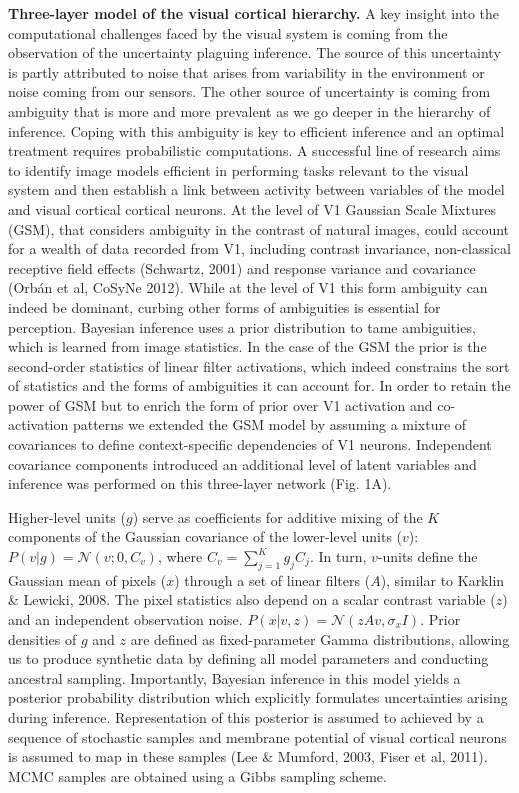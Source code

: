 \documentclass[12pt,a4paper]{article}
\begin{document}
\vspace{5mm}

{\bf Three-layer model of the visual cortical hierarchy.} A key insight into the computational challenges faced by the visual system is coming from the observation of the uncertainty plaguing inference. The source of this uncertainty is partly attributed to noise that arises from variability in the environment or noise coming from our sensors. The other source of uncertainty is coming from ambiguity that is more and more prevalent as we go deeper in the hierarchy of inference. Coping with this ambiguity is key to efficient inference and an optimal treatment requires probabilistic computations. 
A successful line of research aims to identify image models efficient in performing tasks relevant to the visual system and then establish a link between activity between variables of the model and visual cortical cortical neurons. 
At the level of V1 Gaussian Scale Mixtures (GSM), that considers ambiguity in the contrast of natural images, could account for a wealth of data recorded from V1, including contrast invariance, non-classical receptive field effects (Schwartz, 2001) and response variance and covariance (Orb\'an et al, CoSyNe 2012). While at the level of V1 this form ambiguity can indeed be dominant, curbing other forms of ambiguities is essential for perception. Bayesian inference uses a prior distribution to tame ambiguities, which is learned from image statistics. In the case of the GSM the prior is the second-order statistics of linear filter activations, which indeed constrains  the sort of statistics and the forms of ambiguities it can account for. In order to retain the power of GSM but to enrich the form of prior over V1 activation and co-activation patterns we extended the GSM model by assuming a mixture of covariances to define context-specific dependencies of V1 neurons. Independent covariance components introduced an additional level of latent variables and inference was performed on this three-layer network (Fig. 1A).

Higher-level units ($g$) serve as coefficients for additive mixing of the $K$ components of the Gaussian covariance of the lower-level units ($v$): $P(v | g) = \mathcal{N}(v;0,C_v)$, where $C_v = \sum_{j=1}^K g_jC_j$. In turn, $v$-units define the Gaussian mean of pixels ($x$) through a set of linear filters ($A$), similar to Karklin \& Lewicki, 2008. The pixel statistics also depend on a scalar contrast variable ($z$) and an independent observation noise. $P(x|v,z) = \mathcal{N}(zAv,\sigma_x I)$. Prior densities of $g$ and $z$ are defined as fixed-parameter Gamma distributions, allowing us to produce synthetic data by defining all model parameters and conducting ancestral sampling. Importantly, Bayesian inference in this model yields a posterior probability distribution which explicitly formulates  uncertainties arising during inference. Representation of this posterior is assumed to achieved by a sequence of stochastic samples and  membrane potential of visual cortical neurons is assumed to map in these samples (Lee \& Mumford, 2003, Fiser et al, 2011). MCMC samples are obtained using a Gibbs sampling scheme. 
\end{document}
